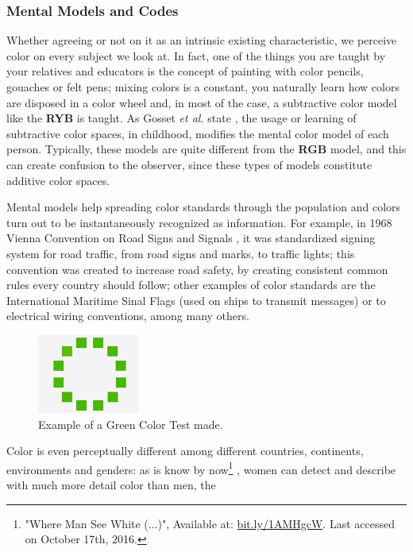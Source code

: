 \subsubsection{Mental Models and Codes}
Whether agreeing or not on it as an intrinsic existing characteristic, we perceive color on every
subject we look at. In fact, one of the things you are taught by your relatives and educators is the concept of
painting with color pencils, gouaches or felt pens; mixing colors is a constant,
you naturally learn how colors are disposed in a color wheel and, in most of the case, a subtractive color
model like the \textbf{RYB} is taught. As Gosset \emph{et al.} state \cite{Gossett2004}, the usage or learning of
subtractive color spaces, in childhood, modifies the mental color model of each person. Typically, these models are quite
different from the \textbf{RGB} model, and this can create confusion to
the observer, since these types of models constitute additive color spaces. \par
Mental models help spreading color standards through the population and colors turn out to be instantaneously
recognized as information. For example, in 1968 Vienna Convention on Road Signs and Signals \cite{Nations1995}, it was standardized signing system for road traffic, from road signs and marks, to traffic lights;
this convention was created to increase road safety, by creating consistent common rules every country
should follow; other examples of color standards are the International Maritime Sinal Flags
\cite{Agency2003} (used on ships to transmit messages) or to electrical wiring conventions, among many others. \par
%
\begin{figure}
	\centering
    \vspace{-\baselineskip}
    \includegraphics[width=0.3\textwidth]{images/background/Himba_green-color-ring.jpg}
    \caption[Himba Test: Green Color Ring]{Example of a Green Color Test made.\protect\footnotemark[10]}
    \label{fig:himba}
\end{figure}
%
Color is even perceptually different among different countries, continents, environments and genders:
as is know by now\footnote{"Where Man See White (...)", Available at:
\url {bit.ly/1AMHgcW}.
Last accessed on October 17th, 2016.} \cite{Ginter2011}, women can detect and describe with much more detail color than men, the
